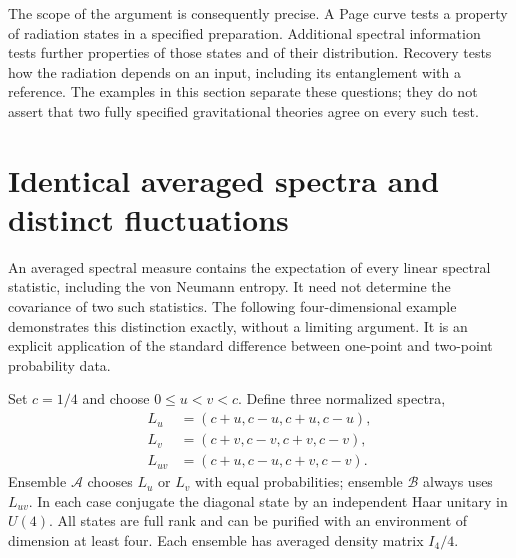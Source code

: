 \documentclass[11pt,letterpaper]{article}
\theoremstyle{plain}
\theoremstyle{definition}
\theoremstyle{remark}
\begin{document}
The scope of the argument is consequently precise. A Page curve tests
a property of radiation states in a specified preparation. Additional
spectral information tests further properties of those states and of
their distribution. Recovery tests how the radiation depends on an
input, including its entanglement with a reference. The examples in
this section separate these questions; they do not assert that two
fully specified gravitational theories agree on every such test.

\section{Identical averaged spectra and distinct fluctuations}
\label{sec16:exact_ensembles}
\label{subsec05:exact_spectral_example}

An averaged spectral measure contains the expectation of every linear
spectral statistic, including the von Neumann entropy.  It need not
determine the covariance of two such statistics.  The following
four-dimensional example demonstrates this distinction exactly, without
a limiting argument.  It is an explicit application of the standard
difference between one-point and two-point probability data.

Set $c=1/4$ and choose $0\leq u<v<c$.  Define three normalized spectra,
\begin{equation}
\label{eq05:exact_spectra}
 \begin{aligned}
 L_u&=(c+u,c-u,c+u,c-u),\\
 L_v&=(c+v,c-v,c+v,c-v),\\
 L_{uv}&=(c+u,c-u,c+v,c-v).
 \end{aligned}
\end{equation}
Ensemble $\mathcal A$ chooses $L_u$ or $L_v$ with equal probabilities;
ensemble $\mathcal B$ always uses $L_{uv}$.  In each case conjugate the
diagonal state by an independent Haar unitary in $U(4)$.  All states
are full rank and can be purified with an environment of dimension at
least four.  Each ensemble has averaged density matrix $I_4/4$.
\end{document}
